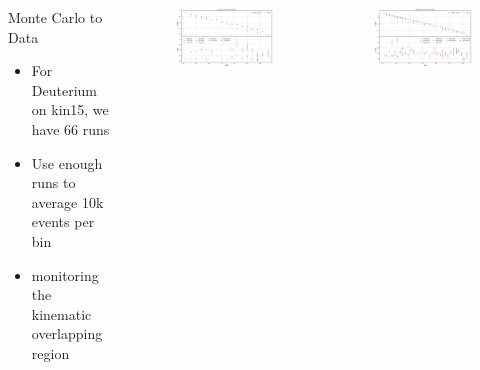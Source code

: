 \documentclass{beamer}
\begin{document}
\begin{frame}
	\begin{columns}
		\begin{block}{Monte Carlo to Data}
		\begin{itemize}
			\item For Deuterium on kin15, we have 66 runs
			\item Use enough runs to average 10k events per bin
			\item monitoring the kinematic overlapping region
		\end{itemize}
		\end{block}
		\vspace{-20pt}
		\begin{figure}
			\includegraphics[width=7.5cm]{../images/D2_all}
		\end{figure}
		\vspace{-40pt}
		\begin{figure}
			\includegraphics[width=7.5cm]{../images/He3_all}
		\end{figure}
	\end{columns}

\end{frame}
\end{document}
